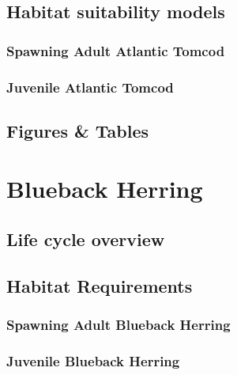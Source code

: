 \documentclass[
]{book}
\begin{document}
\hypertarget{habitat-suitability-models-5}{%
\section{Habitat suitability models}\label{habitat-suitability-models-5}}

\hypertarget{spawning-adult-atlantic-tomcod-1}{%
\subsection{Spawning Adult Atlantic Tomcod}\label{spawning-adult-atlantic-tomcod-1}}

\hypertarget{juvenile-atlantic-tomcod-1}{%
\subsection{Juvenile Atlantic Tomcod}\label{juvenile-atlantic-tomcod-1}}

\hypertarget{figures-tables-5}{%
\section{Figures \& Tables}\label{figures-tables-5}}

\hypertarget{blueback-herring}{%
\chapter{Blueback Herring}\label{blueback-herring}}

\hypertarget{life-cycle-overview-6}{%
\section{Life cycle overview}\label{life-cycle-overview-6}}

\hypertarget{habitat-requirements-6}{%
\section{Habitat Requirements}\label{habitat-requirements-6}}

\hypertarget{spawning-adult-blueback-herring}{%
\subsection{Spawning Adult Blueback Herring}\label{spawning-adult-blueback-herring}}

\hypertarget{juvenile-blueback-herring}{%
\subsection{Juvenile Blueback Herring}\label{juvenile-blueback-herring}}
\end{document}
